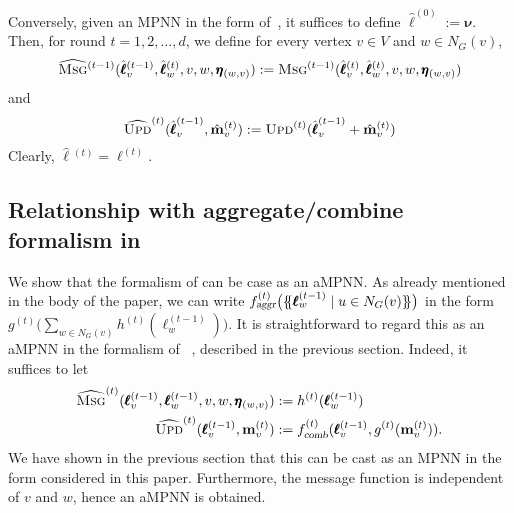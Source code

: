 \documentclass[10pt,a4paper]{article}
\theoremstyle{definition}
\newcommand*{\lmset}{\{\mskip-5mu\{}
\newcommand*{\rmset}{\}\mskip-5mu\}}
\begin{document}
Conversely, given an MPNN in the form of~\citet{Loukas2019}, it suffices to define 
$\hat{\pmb{\ell}}^{(0)}:=\pmb{\nu}$. Then, for round $t=1,2,\ldots,d$, we define for every vertex $v\in V$ and $w\in N_G(v)$,
$$
\widehat{\textsc{Msg}}{}^{(t-1)}(\hat{\pmb{\ell}}{}_v^{(t-1)},\hat{\pmb{\ell}}{}_w^{(t)},v,w,\pmb{\eta}_{(w,v)}):=\textsc{Msg}{}^{(t-1)}(\hat{\pmb{\ell}}{}_v^{(t)},\hat{\pmb{\ell}}{}_w^{(t)},v,w,\pmb{\eta}_{(w,v)})
$$
and 
$$
\widehat{\textsc{Upd}}^{(t)}(\hat{\pmb{\ell}}_v^{(t-1)},\hat{\mathbf{m}}{}^{(t)}_v):=
\textsc{Upd}^{(t)}(\hat{\pmb{\ell}}_v^{(t-1)}+\hat{\mathbf{m}}{}^{(t)}_v)
$$
Clearly, $\hat{\pmb{\ell}}{}^{(t)}=\pmb{\ell}^{(t)}$.

\subsection{Relationship with aggregate/combine formalism in \citet{XuHLJ19}}\label{subsec:aggr}
We show that the formalism of \citep{XuHLJ19} can be case as an aMPNN. As already mentioned in the body of the paper, we can write $f_{\textsl{aggr}}^{(t)}\bigl(\lmset \pmb{\ell}^{(t-1)}_{w} \mid u \in N_G(v) \rmset\bigr)$ in the form $g^{(t)}\bigl(\sum_{w\in N_G(v)} h^{(t)}(\pmb{\ell}^{(t-1)}_{w})\bigr)$. It is straightforward to regard this as an aMPNN in the formalism of ~\citep{GilmerSRVD17}, described in the previous section.
Indeed, it suffices to let 
\begin{align*}
\widehat{\textsc{Msg}}^{(t)}(\pmb{\ell}_v^{(t-1)},\pmb{\ell}_w^{(t-1)},v,w,\pmb{\eta}_{(w,v)})&:=h^{(t)}(\pmb{\ell}_w^{(t-1)})\\
\widehat{\textsc{Upd}}^{(t)}(\pmb{\ell}_v^{(t-1)},\mathbf{m}^{(t)}_v)&:=f_{\textsl{comb}}^{(t)}(\pmb{\ell}_v^{(t-1)},g^{(t)}(\mathbf{m}^{(t)}_v)).
\end{align*}
We have shown in the previous section that this can be cast as an MPNN in the form considered in this paper. Furthermore, the message function is independent of $v$ and $w$, hence an aMPNN is obtained.
\end{document}

